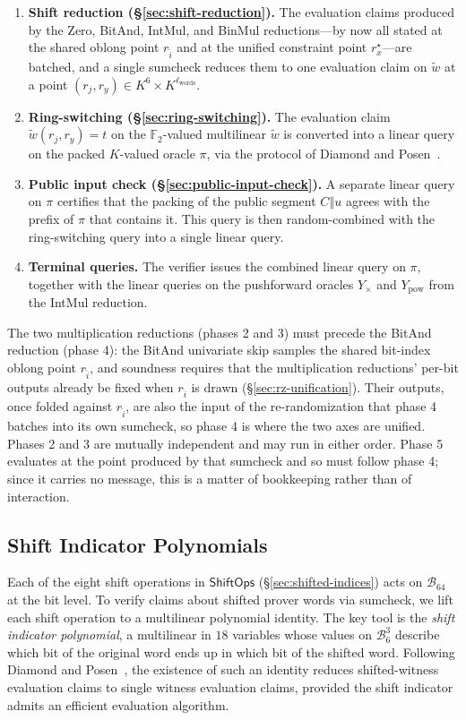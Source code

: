 \documentclass{article}
\theoremstyle{definition}
\newcommand*{\mle}{\widetilde}
\newcommand{\BB}{\mathcal{B}}
\newcommand{\FF}[1]{\mathbb{F}_{#1}}
\begin{document}
\begin{enumerate}
\item \textbf{Shift reduction (\S\ref{sec:shift-reduction}).} The evaluation claims produced by the Zero, BitAnd, IntMul, and BinMul reductions---by now all stated at the shared oblong point $r_{\widehat{i}}$ and at the unified constraint point $r^\star_x$---are batched, and a single sumcheck reduces them to one evaluation claim on $\mle{w}$ at a point $(r_j, r_y) \in K^6 \times K^{\ell_\text{words}}$.
\item \textbf{Ring-switching (\S\ref{sec:ring-switching}).} The evaluation claim $\mle{w}(r_j, r_y) = t$ on the $\FF{2}$-valued multilinear $\mle{w}$ is converted into a linear query on the packed $K$-valued oracle $\pi$, via the protocol of Diamond and Posen~\cite{Diamond:2024ab}.
\item \textbf{Public input check (\S\ref{sec:public-input-check}).} A separate linear query on $\pi$ certifies that the packing of the public segment $C \mathbin{\Vert} u$ agrees with the prefix of $\pi$ that contains it. This query is then random-combined with the ring-switching query into a single linear query.
\item \textbf{Terminal queries.} The verifier issues the combined linear query on $\pi$, together with the linear queries on the pushforward oracles $Y_\times$ and $Y_\text{pow}$ from the IntMul reduction.
\end{enumerate}

The two multiplication reductions (phases 2 and 3) must precede the BitAnd reduction (phase 4): the BitAnd univariate skip samples the shared bit-index oblong point $r_{\widehat{i}}$, and soundness requires that the multiplication reductions' per-bit outputs already be fixed when $r_{\widehat{i}}$ is drawn (\S\ref{sec:rz-unification}). Their outputs, once folded against $r_{\widehat{i}}$, are also the input of the re-randomization that phase 4 batches into its own sumcheck, so phase 4 is where the two axes are unified. Phases 2 and 3 are mutually independent and may run in either order. Phase 5 evaluates at the point produced by that sumcheck and so must follow phase 4; since it carries no message, this is a matter of bookkeeping rather than of interaction.

\subsection{Shift Indicator Polynomials}
\label{sec:shift-indicators}

Each of the eight shift operations in $\textsf{ShiftOps}$ (\S\ref{sec:shifted-indices}) acts on $\BB_{64}$ at the bit level. To verify claims about shifted prover words via sumcheck, we lift each shift operation to a multilinear polynomial identity. The key tool is the \emph{shift indicator polynomial}, a multilinear in $18$ variables whose values on $\BB_6^3$ describe which bit of the original word ends up in which bit of the shifted word. Following Diamond and Posen~\cite[\S 4.3]{Diamond:2025aa}, the existence of such an identity reduces shifted-witness evaluation claims to single witness evaluation claims, provided the shift indicator admits an efficient evaluation algorithm.
\end{document}
